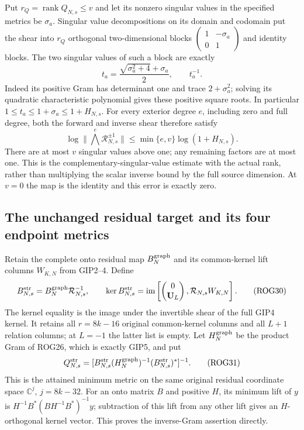 \documentclass[11pt,a4paper]{article}
\begin{document}
Put $r_Q=\operatorname{rank}Q_{N,s}\le v$ and let its nonzero
singular values in the specified metrics be $\sigma_a$.
Singular value decompositions on its domain and codomain put
the shear into $r_Q$ orthogonal two-dimensional blocks
$\left(\begin{smallmatrix}1&-\sigma_a\\0&1\end{smallmatrix}\right)$
and identity blocks. The two singular values of such a block
are exactly
\[
 t_a=\frac{\sqrt{\sigma_a^2+4}+\sigma_a}{2},\qquad t_a^{-1}.
 \tag{ROG28}
\]
Indeed its positive Gram has determinant one and trace
$2+\sigma_a^2$; solving its quadratic characteristic
polynomial gives these positive square roots. In particular
$1\le t_a\le1+\sigma_a\le1+H_{N,s}$.
For every exterior degree $e$, including zero and full degree,
both the forward and inverse shear therefore satisfy
\[
 \log\|\bigwedge^e\mathcal R_{N,s}^{\pm1}\|
       \le\min\{e,v\}\log(1+H_{N,s}).
 \tag{ROG29}
\]
There are at most $v$ singular values above one; any remaining
factors are at most one. This is the complementary-singular-value
estimate with the actual rank, rather than multiplying the
scalar inverse bound by the full source dimension. At $v=0$
the map is the identity and this error is exactly zero.

\subsection{The unchanged residual target and its four endpoint metrics}

Retain the complete onto residual map $B_N^{\rm graph}$ and
its common-kernel lift columns $W_{K,N}$ from GIP2--4. Define
\[
 B_{N,s}^{\rm str}=B_N^{\rm graph}\mathcal R_{N,s}^{-1},\qquad
 \ker B_{N,s}^{\rm str}
   =\operatorname{im}
      \left[\begin{pmatrix}0\\\mathbf U_L\end{pmatrix},
                   \mathcal R_{N,s}W_{K,N}\right].
 \tag{ROG30}
\]
The kernel equality is the image under the invertible shear
of the full GIP4 kernel. It retains all $r=8k-16$ original
common-kernel columns and all $L+1$ relation columns; at
$L=-1$ the latter list is empty. Let $H_N^{\rm graph}$ be
the product Gram of ROG26, which is exactly GIP5, and put
\[
 Q_{N,s}^{\rm str}
    =[B_{N,s}^{\rm str}(H_N^{\rm graph})^{-1}
                      (B_{N,s}^{\rm str})^*]^{-1}.
 \tag{ROG31}
\]
This is the attained minimum metric on the same original
residual coordinate space $\mathbb C^j$, $j=8k-32$.
For an onto matrix $B$ and positive $H$, its minimum lift
of $y$ is $H^{-1}B^*(BH^{-1}B^*)^{-1}y$; subtraction of
this lift from any other lift gives an $H$-orthogonal kernel
vector. This proves the inverse-Gram assertion directly.
\end{document}
